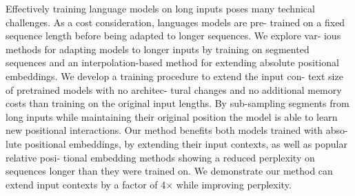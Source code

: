 Effectively training language models on long inputs poses many technical challenges. As a cost consideration, languages models are pre- trained on a fixed sequence length before being adapted to longer sequences. We explore var- ious methods for adapting models to longer inputs by training on segmented sequences and an interpolation-based method for extending absolute positional embeddings. We develop a training procedure to extend the input con- text size of pretrained models with no architec- tural changes and no additional memory costs than training on the original input lengths. By sub-sampling segments from long inputs while maintaining their original position the model is able to learn new positional interactions. Our method benefits both models trained with abso- lute positional embeddings, by extending their input contexts, as well as popular relative posi- tional embedding methods showing a reduced perplexity on sequences longer than they were trained on. We demonstrate our method can extend input contexts by a factor of 4× while improving perplexity.